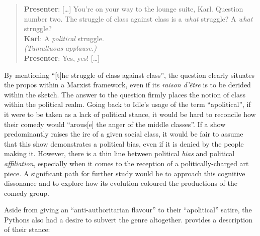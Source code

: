 \documentclass[
,a4paper
,DIV=12
,12pt
,abstract
,bibliography=totoc
]{scrartcl}
\begin{document}
\begin{quote}
  \textbf{Presenter}: […] You're on your way to the lounge suite, Karl. Question number two. The struggle of class against class is a \emph{what} struggle? A \emph{what} struggle?\\
  \textbf{Karl}: A \emph{political} struggle.\\
  \emph{(Tumultuous applause.)}\\
  \textbf{Presenter}: Yes, yes! […]
\end{quote}
By mentioning \enquote{[t]he struggle of class against class}, the question clearly situates the propos within a Marxist framework, even if its \emph{raison d’être} is to be derided within the sketch.  The answer to the question firmly places the notion of class within the political realm.  Going back to Idle’s usage of the term \enquote{apolitical}, if it were to be taken as a lack of political stance, it would be hard to reconcile how their comedy would \enquote{arous[e] the anger of the middle classes}.  If a show predominantly raises the ire of a given social class, it would be fair to assume that this show demonstrates a political bias, even if it is denied by the people making it.  However, there is a thin line between political \emph{bias} and political \emph{affiliation}, especially when it comes to the reception of a politically-charged art piece.  A significant path for further study would be to approach this cognitive dissonance and to explore how its evolution coloured the productions of the comedy group.

Aside from giving an \enquote{anti-authoritarian flavour} to their \enquote{apolitical} satire, the Pythons also had a desire to subvert the genre altogether.  \textcite{geng1990} provides a description of their stance:
\end{document}

